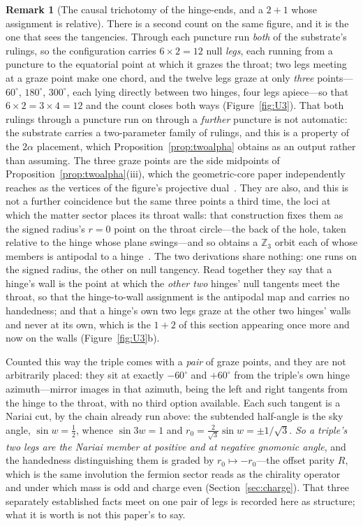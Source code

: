 \documentclass[11pt,a4paper]{article}
\theoremstyle{definition}
\newtheorem{remark}[theorem]{Remark}
\begin{document}
\begin{remark}[The causal trichotomy of the hinge-ends, and a $2{+}1$ whose assignment is relative]
There is a second count on the same figure, and it is the one that sees the tangencies. Through each puncture run \emph{both} of the substrate's rulings, so the configuration carries $6\times2=12$ null \emph{legs}, each running from a puncture to the equatorial point at which it grazes the throat; two legs meeting at a graze point make one chord, and the twelve legs graze at only \emph{three} points---$60^{\circ}$, $180^{\circ}$, $300^{\circ}$, each lying directly between two hinges, four legs apiece---so that $6\times2=3\times4=12$ and the count closes both ways (Figure~\ref{fig:U3}). That both rulings through a puncture run on through a \emph{further} puncture is not automatic: the substrate carries a two-parameter family of rulings, and this is a property of the $2\alpha$ placement, which Proposition~\ref{prop:twoalpha} obtains as an output rather than assuming. The three graze points are the side midpoints of Proposition~\ref{prop:twoalpha}(iii), which the geometric-core paper independently reaches as the vertices of the figure's projective dual~\cite{JanzenGeometricCore}. They are also, and this is not a further coincidence but the same three points a third time, the loci at which the matter sector places its throat walls: that construction fixes them as the signed radius's $r=0$ point on the throat circle---the back of the hole, taken relative to the hinge whose plane swings---and so obtains a $\mathbb{Z}_3$ orbit each of whose members is antipodal to a hinge~\cite{JanzenMatter}. The two derivations share nothing: one runs on the signed radius, the other on null tangency. Read together they say that a hinge's wall is the point at which the \emph{other two} hinges' null tangents meet the throat, so that the hinge-to-wall assignment is the antipodal map and carries no handedness; and that a hinge's own two legs graze at the other two hinges' walls and never at its own, which is the $1+2$ of this section appearing once more and now on the walls (Figure~\ref{fig:U3}b).

Counted this way the triple comes with a \emph{pair} of graze points, and they are not arbitrarily placed: they sit at exactly $-60^{\circ}$ and $+60^{\circ}$ from the triple's own hinge azimuth---mirror images in that azimuth, being the left and right tangents from the hinge to the throat, with no third option available. Each such tangent is a Nariai cut, by the chain already run above: the subtended half-angle is the sky angle, $\sin w=\tfrac12$, whence $\sin3w=1$ and $r_{0}=\tfrac{2}{\sqrt3}\sin w=\pm1/\sqrt3$. \emph{So a triple's two legs are the Nariai member at positive and at negative gnomonic angle}, and the handedness distinguishing them is graded by $r_{0}\mapsto-r_{0}$---the offset parity $R$, which is the same involution the fermion sector reads as the chirality operator~\cite{JanzenMatter} and under which mass is odd and charge even (Section~\ref{sec:charge}). That three separately established facts meet on one pair of legs is recorded here as structure; what it is worth is not this paper's to say.


\end{remark}
\end{document}
